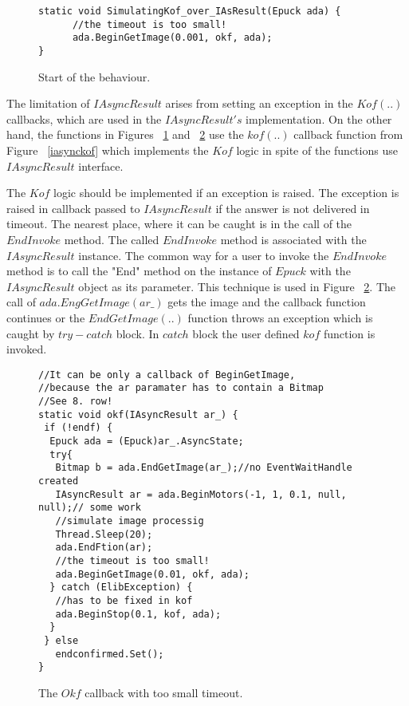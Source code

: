 \begin{figure}[!hbp]
\begin{lstlisting}
static void SimulatingKof_over_IAsResult(Epuck ada) {
      //the timeout is too small!
      ada.BeginGetImage(0.001, okf, ada);
}
\end{lstlisting}
\caption{Start of the behaviour.}
\label{c:start}
\end{figure}

	The limitation of $IAsyncResult$ arises from setting an exception in the $Kof(..)$ callbacks,
	which are used in the $IAsyncResult's$ implementation.
	On the other hand, the functions in Figures ~\ref{c:start} and ~\ref{c:okfsim} use the $kof(..)$ callback function
	from Figure ~\ref{iasynckof} 
	which implements the $Kof$ logic in spite of the functions use $IAsyncResult$ interface.

	The $Kof$ logic should be implemented if an exception is raised. 
	The exception is raised in callback passed to $IAsyncResult$ if the answer is not delivered in timeout. 
	The nearest place, where it can be caught is in the call of the $EndInvoke$ method.
	The called $EndInvoke$ method is associated with the $IAsyncResult$ instance. 
	The common way for a user to invoke the $EndInvoke$ method is to call the "End" method 
	on the instance of $Epuck$ with the $IAsyncResult$ object as its parameter. 
	This technique is used in Figure ~\ref{c:okfsim}.
	The call of $ada.EngGetImage(ar\_)$ gets the image and the callback function continues
	or the $EndGetImage(..)$ function throws an exception which is caught by $try-catch$ block.
	In $catch$ block the user defined $kof$ function is invoked.
	
\begin{figure}[!hbp]
\begin{lstlisting}
//It can be only a callback of BeginGetImage,
//because the ar paramater has to contain a Bitmap
//See 8. row!
static void okf(IAsyncResult ar_) {
 if (!endf) {
  Epuck ada = (Epuck)ar_.AsyncState;
  try{
   Bitmap b = ada.EndGetImage(ar_);//no EventWaitHandle created
   IAsyncResult ar = ada.BeginMotors(-1, 1, 0.1, null, null);// some work
   //simulate image processig
   Thread.Sleep(20);
   ada.EndFtion(ar);
   //the timeout is too small!
   ada.BeginGetImage(0.01, okf, ada);
  } catch (ElibException) {
   //has to be fixed in kof
   ada.BeginStop(0.1, kof, ada);
  }
 } else
   endconfirmed.Set();
}
\end{lstlisting}
\caption{The $Okf$ callback with too small timeout.}
\label{c:okfsim}
\end{figure}

